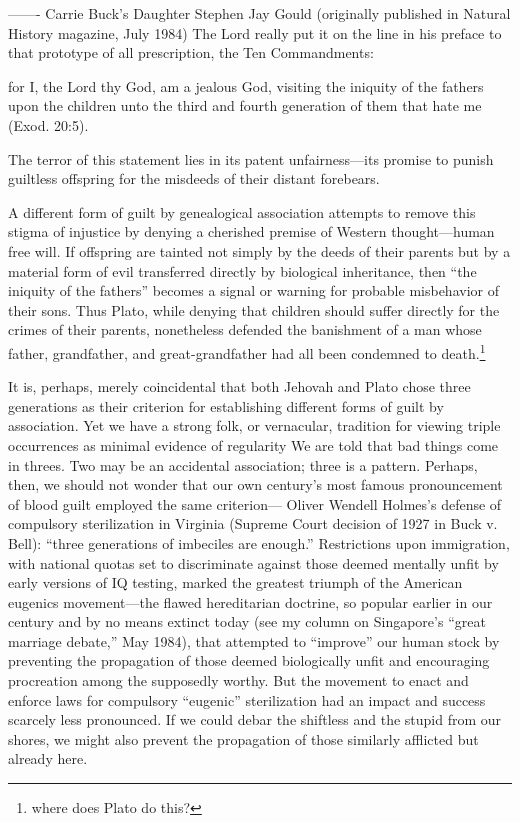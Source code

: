 \documentclass[12pt]{letter}
\begin{document}
-------
Carrie Buck’s Daughter
Stephen Jay Gould
(originally published in Natural History magazine, July 1984)
The Lord really put it on the line in his preface to that prototype of all prescription, the
Ten Commandments:

for I, the Lord thy God, am a jealous God, visiting the iniquity of the fathers
upon the children unto the third and fourth generation of them that hate me
(Exod. 20:5).

The terror of this statement lies in its patent unfairness—its promise to punish guiltless
offspring for the misdeeds of their distant forebears.

A different form of guilt by genealogical association attempts to remove this stigma of
injustice by denying a cherished premise of Western thought—human free will. If
offspring are tainted not simply by the deeds of their parents but by a material form of
evil transferred directly by biological inheritance, then “the iniquity of the fathers”
becomes a signal or warning for probable misbehavior of their sons. Thus Plato, while
denying that children should suffer directly for the crimes of their parents, nonetheless
defended the banishment of a man whose father, grandfather, and great-grandfather had
all been condemned to death.\footnote{where does Plato do this?}

It is, perhaps, merely coincidental that both Jehovah and Plato chose three generations as
their criterion for establishing different forms of guilt by association. Yet we have a
strong folk, or vernacular, tradition for viewing triple occurrences as minimal evidence of
regularity We are told that bad things come in threes. Two may be an accidental
association; three is a pattern. Perhaps, then, we should not wonder that our own
century’s most famous pronouncement of blood guilt employed the same criterion—
Oliver Wendell Holmes’s defense of compulsory sterilization in Virginia (Supreme Court
decision of 1927 in Buck v. Bell): “three generations of imbeciles are enough.”
Restrictions upon immigration, with national quotas set to discriminate against those
deemed mentally unfit by early versions of IQ testing, marked the greatest triumph of the
American eugenics movement—the flawed hereditarian doctrine, so popular earlier in
our century and by no means extinct today (see my column on Singapore’s “great
marriage debate,” May 1984), that attempted to “improve” our human stock by
preventing the propagation of those deemed biologically unfit and encouraging
procreation among the supposedly worthy. But the movement to enact and enforce laws
for compulsory “eugenic” sterilization had an impact and success scarcely less
pronounced. If we could debar the shiftless and the stupid from our shores, we might also
prevent the propagation of those similarly afflicted but already here.
\end{document}
